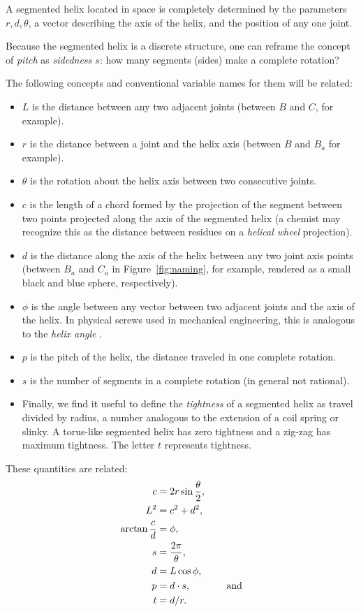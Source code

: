 \documentclass[mathematics,article,submit,pdftex,moreauthors]{Definitions/mdpi}
\begin{document}
A segmented helix located in space is completely determined by
the parameters $r,d,\theta$,
a vector describing the axis
of the helix, and the position of any one joint.

Because the segmented helix is a discrete structure, one can reframe the concept of {\em pitch} as {\em sidedness $s$}:
how many segments (sides)
make a complete rotation?

The following concepts and conventional variable names for them will be related:
\begin{itemize}
\item $L$ is the distance between any two adjacent joints (between $B$ and $C$, for example).
  \item $r$ is the distance between a joint and the helix axis (between $B$ and $B_a$ for example).
  \item $\theta$ is the rotation about the helix axis between two consecutive joints.
  \item $c$ is the length of a chord formed by the projection of the segment between two points projected along the axis of the segmented helix (a chemist may recognize this as the distance between residues on a {\em helical wheel} projection).
  \item $d$ is the distance along the axis of the helix between any two joint axis points (between $B_a$ and $C_a$ in Figure~\ref{fig:naming}, for example, rendered as a small black and blue
    sphere, respectively).
\item $\phi$ is the angle between any vector between two adjacent joints and the axis of the helix. In physical screws used in mechanical engineering, this is analogous to the {\em helix angle} \cite{wiki:helixangle}.
  \item $p$ is the pitch of the helix, the distance traveled in one complete rotation.
  \item $s$ is the number of segments in a complete rotation (in general not rational).
\item  Finally, we find it useful to define the {\em tightness} of a segmented helix
as travel divided by radius, a number
analogous to the extension of a coil spring or slinky.
A torus-like segmented helix has zero tightness and a zig-zag has
maximum tightness. The letter $t$ represents tightness.

  \end{itemize}
These quantities are related:
\begin{align}
    c &= 2r\sin{\frac{\theta}{2}}, \\
    L^2 &= c^2+d^2,  \\
    \arctan{\frac{c}{d}}  &= \phi, \\
    s &= \frac{2 \pi}{\theta}, \\
    d &= L \cos{\phi}, \\
    p &= d \cdot s, \text{ \hspace{3em} and}\\
    t &= d / r.
\end{align}
\end{document}
